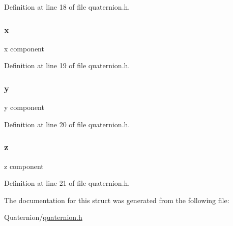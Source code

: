 Definition at line 18 of file quaternion.h.

\hypertarget{struct__quaternion_a57feec2241004ce8ef4d3bd23dbca8a4}{
\subsubsection[{x}]{ {\bf x}}}
\label{struct__quaternion_a57feec2241004ce8ef4d3bd23dbca8a4}
x component 

Definition at line 19 of file quaternion.h.

\hypertarget{struct__quaternion_ae436ba8801f1bf67b94d3f48c6299456}{
\subsubsection[{y}]{ {\bf y}}}
\label{struct__quaternion_ae436ba8801f1bf67b94d3f48c6299456}
y component 

Definition at line 20 of file quaternion.h.

\hypertarget{struct__quaternion_a6aad713ac1638c36d58a7f84e28f9bf0}{
\subsubsection[{z}]{ {\bf z}}}
\label{struct__quaternion_a6aad713ac1638c36d58a7f84e28f9bf0}
z component 

Definition at line 21 of file quaternion.h.



The documentation for this struct was generated from the following file:\begin{DoxyCompactItemize}
\item 
Quaternion/\hyperlink{quaternion_8h}{quaternion.h}\end{DoxyCompactItemize}
